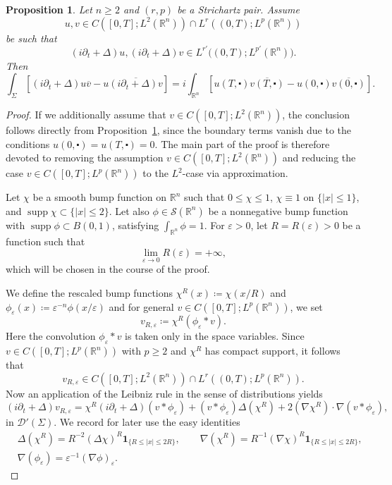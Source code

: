 \documentclass[10pt,a4paper]{amsart}
\newtheorem{proposition}{Proposition}
\newcommand{\R}{\mathbb{R}}
\def\cd{\centerdot}
\def\d{\partial}
\def\ind{\mathbf 1}
\def\ovl{\overline}
\DeclareMathOperator{\supp}{supp}
\def\ve{\varepsilon}
\begin{document}
\begin{proposition}\label{prp:integration_by_parts_unbounded_no-endpoint}\sl Let $n\geq 2$ and $(r,p)$ be a Strichartz pair. Assume
\[
u,v \in C\left ([0,T];L^2(\R^n)\right) \cap L^r\left((0,T);L^p(\R^n)\right)
\]
be such that
\[
(i\partial_t+\Delta)u, (i\partial_t+\Delta)v \in L^{r'}\big((0,T);L^{p'}(\R^n)\big).
\]
Then
\[
\int_{\Sigma} \left[(i\partial_t+\Delta)u \ovl v - u \ovl{(i\partial_t+\Delta)v}\right] = i \int_{\R^n} \left[u(T,\cd)\ovl{v(T,\cd)}-u(0,\cd)\ovl{v(0,\cd)}\right].
\]
\end{proposition}

\begin{proof} If we additionally assume that $v\in C([0,T];L^2(\R^n))$, the conclusion follows directly from Proposition~\ref{prp:integration_by_parts_unbounded_no-endpoint}, since the boundary terms vanish due to the conditions $u(0,\cd)=u(T,\cd)=0$. The main part of the proof is therefore devoted to removing the assumption $v\in C([0,T];L^2(\R^n))$ and reducing the case $v\in C([0,T];L^p(\R^n))$ to the $L^2$-case via approximation.

Let $\chi$ be a smooth bump function on $\R^n$ such that $0\leq \chi \leq 1$, $\chi\equiv 1$ on $\{|x|\leq 1\}$, and $\supp \chi \subset \{|x|\leq 2\}$. Let also $\phi\in \mathcal S(\R^n)$ be a nonnegative bump function with $\supp \phi \subset B(0,1)$, satisfying $\int_{\R^n}\phi=1$. For $\varepsilon>0$, let $R=R(\varepsilon)>0$ be a function such that
\[
\lim_{\varepsilon\to0} R(\varepsilon)=+\infty,
\]
which will be chosen in the course of the proof.

We define the rescaled bump functions $\chi^R(x)\coloneqq \chi(x/R)$ and $\phi_\varepsilon(x)\coloneqq \varepsilon^{-n}\phi(x/\varepsilon)$ and for general $v \in C([0,T];L^p(\R^n))$, we set
\[
v_{R,\varepsilon} \coloneqq \chi^R (\phi_\varepsilon * v).
\]
Here the convolution $\phi_\varepsilon * v$ is taken only in the space variables.  Since $v\in C([0,T];L^p(\R^n))$ with $p\geq 2$ and $\chi^R$ has compact support, it follows that
\[
v_{R,\varepsilon}\in C\left([0,T];L^2(\R^n)\right) \cap L^r\left((0,T);L^p(\R^n)\right).
\]
Now an application of the Leibniz rule in the sense of distributions yields
\begin{equation}\label{eq:Leibniz_distributional}
\left(i \d_t + \Delta \right)v_{R, \ve} = \chi^R \left(i\d_t + \Delta\right)(v*\phi_\ve) +  ( v*\phi_\ve ) \Delta(\chi^R)  + 2 ( \nabla \chi^R ) \cdot \nabla (v*\phi_\ve),
\end{equation}
in $\mathcal{D}' (\Sigma)$. We record for later use the easy identities
\begin{equation}\label{eq:scalederiv}
\begin{split}
& \Delta(\chi^R) = R^{-2} (\Delta \chi)^R \ind_{\{R\leq |x| \leq 2R\}}, \qquad \nabla (\chi^R) = R^{-1} (\nabla \chi)^R \ind_{\{R\leq |x| \leq 2R\}}, 
\\
&  \nabla (\phi_\ve) = \ve^{-1} (\nabla \phi)_{\ve}. 
\end{split}
\end{equation}


\end{proof}
\end{document}
